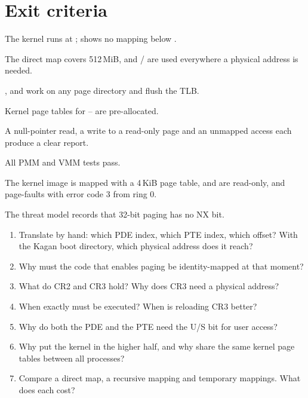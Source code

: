 \documentclass[11pt,a4paper]{article}
\begin{document}
\section{Exit criteria}

\begin{milestonebox}
\begin{checklist}
  \item The kernel runs at ;  shows no mapping below .
  \item The direct map covers 512\,MiB, and / are used everywhere a physical address is needed.
  \item {},  and  work on any page directory and flush the TLB.
  \item Kernel page tables for -- are pre-allocated.
  \item A null-pointer read, a write to a read-only page and an unmapped access each produce a clear report.
  \item All PMM and VMM tests pass.
  \item The kernel image is mapped with a 4\,KiB page table,  and  are read-only, and  page-faults with error code 3 from ring 0.
  \item The threat model records that 32-bit paging has no NX bit.
\end{checklist}
\end{milestonebox}

\begin{questionbox}
\begin{enumerate}
  \item Translate  by hand: which PDE index, which PTE index, which offset? With the Kagan boot directory, which physical address does it reach?
  \item Why must the code that enables paging be identity-mapped at that moment?
  \item What do CR2 and CR3 hold? Why does CR3 need a physical address?
  \item When exactly must  be executed? When is reloading CR3 better?
  \item Why do both the PDE and the PTE need the U/S bit for user access?
  \item Why put the kernel in the higher half, and why share the same kernel page tables between all processes?
  \item Compare a direct map, a recursive mapping and temporary mappings. What does each cost?
\end{enumerate}
\end{questionbox}
\end{document}
